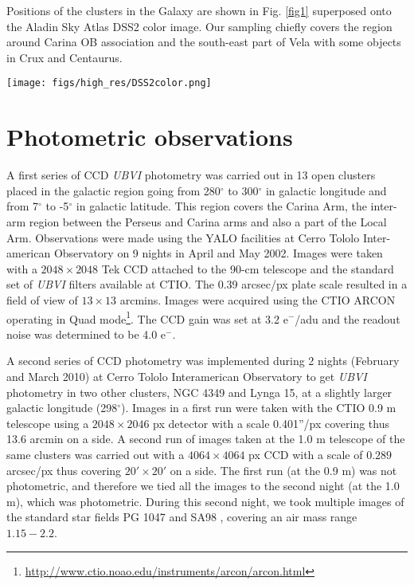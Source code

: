 \documentclass{aa}
\begin{document}
Positions of the clusters in the Galaxy are shown in Fig. \ref{fig1} superposed
onto the Aladin Sky Atlas DSS2 color image. Our sampling chiefly covers the
region around Carina OB association and the south-east part of Vela with some
objects in Crux and Centaurus.

\begin{figure*}[ht]
    \centering
    \texttt{[image: figs/high\_res/DSS2color.png]}
    \caption{DSS2 color Aladin image showing with white circles the position of
    the clusters surveyed in the present sample. The galactic coordinates $l$
    and $b$ are depicted by a green grid while constellation limits for Carina,
    Vela, Centaurus and Crux appear in yellow lines.}
    \label{fig1}
\end{figure*}




\section{Photometric observations}
\label{sec:photo_obs}

A first series of CCD \emph{UBVI} photometry was carried out in 13 open clusters
placed in the galactic region going from 280$^\circ$ to 300$^\circ$ in galactic
longitude and from 7$^\circ$ to -5$^\circ$ in galactic latitude. This region
covers the Carina Arm, the inter-arm region between the Perseus and Carina arms
and also a part of the Local Arm.
Observations were made using the YALO facilities at Cerro Tololo Inter-american
Observatory on 9 nights in April and May 2002. Images were taken with a
$2048\times2048$ Tek CCD attached to the 90-cm telescope and the standard set of
\textit{UBVI} filters available at CTIO. The 0.39 arcsec/px plate scale
resulted in a field of view of $13\times13$ arcmins. Images were acquired using
the CTIO ARCON operating in Quad
mode\footnote{\url{http://www.ctio.noao.edu/instruments/arcon/arcon.html}}. The
CCD gain was set at 3.2 e$^-$/adu and the readout noise was determined to be 4.0
e$^-$.

A second series of CCD photometry was implemented during 2 nights (February and
March 2010) at Cerro Tololo Interamerican Observatory to get \textit{UBVI}
photometry in two other clusters, NGC 4349 and Lynga 15, at a slightly larger
galactic longitude (298$^\circ$). Images in a first run were taken with the CTIO
0.9 m telescope using a $2048\times2046$ px detector with a scale 0.401”/px
covering thus 13.6 arcmin on a side. A second run of images taken at the 1.0 m
telescope of the same clusters was carried out with a $4064\times4064$ px CCD
with a scale of $0.289$ arcsec/px thus covering $20\prime\times20\prime$ on a
side.
%
The first run (at the 0.9 m) was not photometric, and therefore we tied all
the images to the second night (at the 1.0 m), which was photometric. During
this second night, we took multiple images of the standard star fields PG 1047
and SA98 \citep{1992AJ....104..340L}, covering an air mass range $1.15-2.2$.
\end{document}
